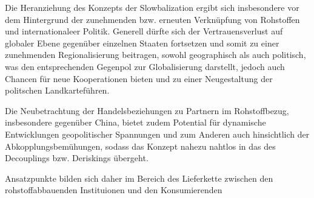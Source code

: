 \documentclass[12pt,a4paper,oneside]{book} %
\begin{document}
	Die Heranziehung des Konzepts der Slowbalization ergibt sich insbesondere vor dem Hintergrund der zunehmenden bzw. erneuten Verknüpfung von Rohstoffen und internationaleer Politik. Generell dürfte sich der Vertrauensverlust auf globaler Ebene gegenüber einzelnen Staaten fortsetzen und somit zu einer zunehmenden Regionalisierung beitragen, sowohl geographisch als auch politisch, was den entsprechenden Gegenpol zur Globalisierung darstellt, jedoch auch Chancen für neue Kooperationen bieten und zu einer \glqq Neugestaltung der politschen Landkarte\grqq führen.\autocite{UI Report, The politics of critical raw materials, S. 4-5}
	
	Die Neubetrachtung der Handelsbeziehungen zu Partnern im Rohstoffbezug, insbesondere gegenüber China, bietet zudem Potential für dynamische Entwicklungen geopolitischer Spannungen und zum Anderen auch hinsichtlich der Abkopplungsbemühungen, sodass das Konzept nahezu nahtlos in das des Decouplings bzw. Deriskings übergeht. 
	
	Ansatzpunkte bilden sich daher im Bereich des Lieferkette zwischen den rohstoffabbauenden Instituionen und den Konsumierenden
	
	
\end{document}
